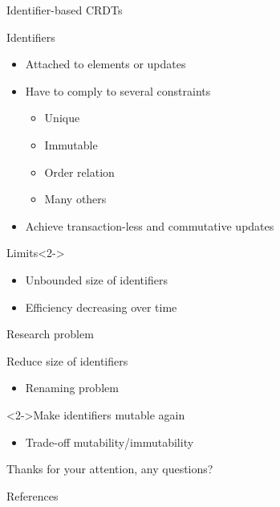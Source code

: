 \documentclass[10pt]{beamer}
\begin{document}
\begin{frame}{Identifier-based \acp{CRDT}}
  \begin{block}{Identifiers}
    \begin{itemize}
      \item Attached to elements or updates
      \item Have to comply to several constraints
      \begin{itemize}
        \item Unique
        \item Immutable
        \item Order relation
        \item Many others
      \end{itemize}
      \item Achieve transaction-less and commutative updates
    \end{itemize}
  \end{block}
  \begin{alertblock}{Limits}<2->
    \begin{itemize}
      \item Unbounded size of identifiers
      \item Efficiency decreasing over time
    \end{itemize}
  \end{alertblock}
\end{frame}

\begin{frame}{Research problem}
  \begin{block}{Reduce size of identifiers}
    \begin{itemize}
      \item Renaming problem\cite{AlistarhAGG2011}
    \end{itemize}
  \end{block}
  \begin{alertblock}<2->{Make identifiers mutable again}
    \begin{itemize}
      \item Trade-off mutability/immutability
    \end{itemize}
  \end{alertblock}
\end{frame}

\begin{frame}[standout]
  Thanks for your attention, any questions?
  \vspace{3em}
  \begin{center}
    \ccby
  \end{center}
\end{frame}


\begin{frame}[allowframebreaks]{References}
	
	
\end{frame}
\end{document}
